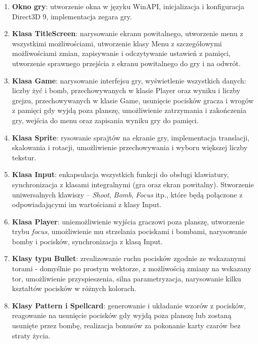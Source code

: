 \documentclass[a4paper,twoside]{article}
\begin{document}
\begin{enumerate}
	
	\item \textbf{Okno gry}: utworzenie okna w języku WinAPI, inicjalizacja i konfiguracja Direct3D 9, implementacja zegara gry.
	
	\item \textbf{Klasa TitleScreen}: narysowanie ekranu powitalnego, utworzenie menu z wszystkimi możliwościami, utworzenie klasy Menu z szczegółowymi możliwościami zmian, zapisywanie i odczytywanie ustawień z pamięci, utworzenie sprawnego przejścia z ekranu powitalnego do gry i na odwrót.
	
	\item \textbf{Klasa Game}: narysowanie interfejsu gry, wyświetlenie wszystkich danych: liczby żyć i bomb, przechowywanych w klasie Player oraz wyniku i liczby grejzu, przechowywanych w klasie Game, usunięcie pocisków gracza i wrogów z pamięci gdy wyjdą poza planszę, umożliwienie zatrzymania i zakończenia gry, wejścia do menu oraz zapisania wyniku gry do pamięci.		
	
	\item \textbf{Klasa Sprite}: rysowanie sprajtów na ekranie gry, implementacja translacji, skalowania i rotacji, umożliwienie przechowywania i wyboru większej liczby tekstur.
	
	\item \textbf{Klasa Input}: enkapsulacja wszystkich funkcji do obsługi klawiatury, synchronizacja z klasami integralnymi (gra oraz ekran powitalny). Stworzenie uniwersalnych klawiszy – \emph{Shoot}, \emph{Bomb}, \emph{Focus} itp., które będą połączone z odpowiadającymi im wartościami z klasy Input.
	
	\item \textbf{Klasa Player}: uniemożliwienie wyjścia graczowi poza planszę, utworzenie trybu \emph{focus}, umożliwienie mu strzelania pociskami i bombami, narysowanie bomby i pocisków, synchronizacja z klasą Input.	

	\item \textbf{Klasy typu Bullet}: zrealizowanie ruchu pocisków zgodnie ze wskazanymi torami - domyślnie po prostym wektorze, z możliwością zmiany na wskazany tor, umożliwienie przyspieszenia, silna parametryzacja, narysowanie kilku kształtów pocisków w różnych kolorach.

	\item \textbf{Klasy Pattern i Spellcard}: generowanie i układanie wzorów z pocisków, reagowanie na usunięcie pocisków gdy wyjdą poza planszę lub zostaną usunięte przez bombę, realizacja bonusów za pokonanie karty czarów bez straty życia.


\end{enumerate}
\end{document}
